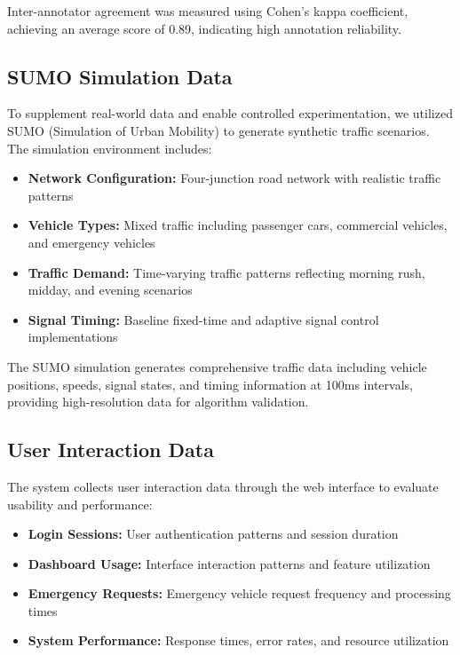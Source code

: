 \documentclass[conference]{IEEEtran}
\begin{document}
Inter-annotator agreement was measured using Cohen's kappa coefficient, achieving an average score of 0.89, indicating high annotation reliability.

\subsection{SUMO Simulation Data}

To supplement real-world data and enable controlled experimentation, we utilized SUMO (Simulation of Urban Mobility) to generate synthetic traffic scenarios. The simulation environment includes:

\begin{itemize}
\item \textbf{Network Configuration:} Four-junction road network with realistic traffic patterns
\item \textbf{Vehicle Types:} Mixed traffic including passenger cars, commercial vehicles, and emergency vehicles
\item \textbf{Traffic Demand:} Time-varying traffic patterns reflecting morning rush, midday, and evening scenarios
\item \textbf{Signal Timing:} Baseline fixed-time and adaptive signal control implementations
\end{itemize}

The SUMO simulation generates comprehensive traffic data including vehicle positions, speeds, signal states, and timing information at 100ms intervals, providing high-resolution data for algorithm validation.

\subsection{User Interaction Data}

The system collects user interaction data through the web interface to evaluate usability and performance:

\begin{itemize}
\item \textbf{Login Sessions:} User authentication patterns and session duration
\item \textbf{Dashboard Usage:} Interface interaction patterns and feature utilization
\item \textbf{Emergency Requests:} Emergency vehicle request frequency and processing times
\item \textbf{System Performance:} Response times, error rates, and resource utilization
\end{itemize}
\end{document}
